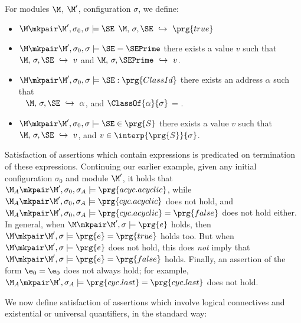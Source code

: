 \begin{definition} For modules $\M$, $\M'$,  configuration $\sigma$,  we define$:$
\label{def:valid:assertion:basic}
\begin{itemize}
\item
$\M\mkpair \M', \sigma_0 ,\sigma \models\SE$ \IFF   $ \M,\,  \sigma, \SE \ \hookrightarrow\   \prg{true}$ 
\item
$\M\mkpair \M',\sigma_0 , \sigma \models\SE=\SEPrime$ \IFF there exists a value $v$ such that  $\M,\,  \sigma, \SE \ \hookrightarrow\   v$  and $ \M,\,  \sigma, \SEPrime \ \hookrightarrow\   v$.
           \item
$\M\mkpair \M',\sigma_0 , \sigma \models\SE:\prg{ClassId}$ \IFF there exists an address $\alpha$ such that \\
$\strut ~ $ \hspace{2in} \hfill   
 $ \M,\,  \sigma, \SE \ \hookrightarrow\   \alpha$, and $\ClassOf{\alpha}{\sigma}$ = .
\item
$\M\mkpair \M',\sigma_0 , \sigma \models \SE\in \prg{S}$ \IFF there exists a value $v$ such that 
 $ \M,\,  \sigma, \SE \ \hookrightarrow\   v$, and $v \in \interp{\prg{S}}{\sigma}$.
\end{itemize}
\end{definition}

Satisfaction of assertions which contain expressions is predicated on termination of these expressions.
Continuing our earlier example, given any initial configuration $\sigma_0$ and module $\M'$, it holds that  
$\M_A\mkpair \M', \sigma_0,\sigma_A \models \prg{acyc.acyclic}$, while $\M_A\mkpair \M', \sigma_0,\sigma_A \models \prg{cyc.acyclic}$
does not hold, and $\M_A\mkpair \M', \sigma_0,\sigma_A \models \prg{cyc.acyclic}=\prg{false}$ does not hold either.
In general, when $\M\mkpair \M', \sigma  \models \prg{e}$ holds,  then $\M\mkpair \M', \sigma  \models \prg{e}=\prg{true}$ holds too.
But when $\M\mkpair \M', \sigma  \models \prg{e}$ does not hold, this does \emph{not} imply that $\M\mkpair \M', \sigma  \models \prg{e}=\prg{false}$ holds.
Finally, an assertion of the form $\e_0=\e_0$ does not always hold; for example,   $\M_A\mkpair \M', \sigma_A \models \prg{cyc.last}=\prg{cyc.last}$ does not hold.

We now define satisfaction of assertions which involve logical connectives and existential or universal quantifiers, in the standard way:


